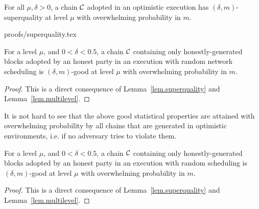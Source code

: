 \begin{lemma}[Superquality]
\label{lem.superquality}
For all $\mu, \delta > 0$, a chain $\mathcal{C}$ adopted in an optimistic execution
has $(\delta, m)$-superquality at level $\mu$ with overwhelming probability in
$m$.
\end{lemma}
{proofs/superquality.tex}

\begin{lemma}
\label{lem.superchain-distribution}
For a level $\mu$, and $0 < \delta < 0.5$, a chain
$\mathcal{C}$ containing only honestly-generated blocks adopted by an honest party in
an execution with random network scheduling is $(\delta, m)$-good at level
$\mu$ with overwhelming probability in $m$.
\end{lemma}
\begin{proof}
This is a direct consequence of Lemma~\ref{lem.superquality} and
Lemma~\ref{lem.multilevel}. \Qed
\end{proof}

It is not hard to see that the above good statistical properties are attained
with overwhelming probability by all chains that are generated in optimistic
environments, i.e. if no adversary tries to violate them.

\begin{lemma}
\label{lem.superchain-distribution}
For a level $\mu$, and $0 < \delta < 0.5$, a chain
$\mathcal{C}$ containing only honestly-generated blocks adopted by an honest party in
an execution with random scheduling is $(\delta, m)$-good at level
$\mu$ with overwhelming probability in $m$.
\end{lemma}
\begin{proof}
This is a direct consequence of Lemma~\ref{lem.superquality} and
Lemma~\ref{lem.multilevel}. \Qed
\end{proof}
